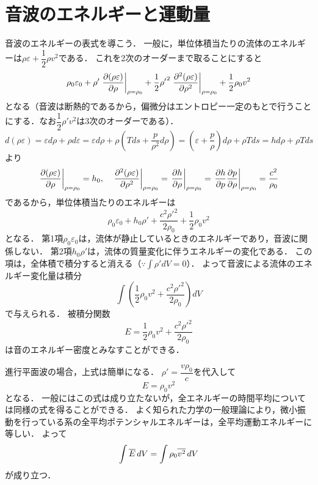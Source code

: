 \section{音波のエネルギーと運動量}

音波のエネルギーの表式を導こう．
一般に，単位体積当たりの流体のエネルギーは$\rho\varepsilon+\dfrac{1}{2}\rho v^2$である．
これを2次のオーダーまで取ることにすると
\[
    \rho_0\varepsilon_0 + \rho' \eval{\pdv{(\rho\varepsilon)}{\rho}}_{\rho=\rho_0} + \frac{1}{2} {\rho'}^2 \eval{\pdv[2]{(\rho\varepsilon)}{\rho}}_{\rho=\rho_0}
    +\frac{1}{2}\rho_0 v^2
\]
となる（音波は断熱的であるから，偏微分はエントロピー一定のもとで行うことにする．なお$\dfrac{1}{2}\rho' v^2$は3次のオーダーである）．
\[
    d(\rho\varepsilon) = \varepsilon d\rho + \rho d\varepsilon
    = \varepsilon d\rho + \rho\left(Tds+\frac{p}{\rho^2}d\rho\right)
    = \left( \varepsilon+\frac{p}{\rho} \right) d\rho + \rho T ds
    = h d\rho + \rho T ds
\]
より
\[
    \eval{\pdv{(\rho\varepsilon)}{\rho}}_{\rho=\rho_0} = h_0, \quad
    \eval{\pdv[2]{(\rho\varepsilon)}{\rho}}_{\rho=\rho_0} = \eval{\pdv{h}{\rho}}_{\rho=\rho_0}
    = \eval{\pdv{h}{p}\pdv{p}{\rho}}_{\rho=\rho_0} = \frac{c^2}{\rho_0}
\]
であるから，単位体積当たりのエネルギーは
\[
    \rho_0\varepsilon_0 + h_0 \rho' + \frac{c^2{\rho'}^2}{2\rho_0} + \frac{1}{2} \rho_0 v^2
\]
となる．
第1項$\rho_0\varepsilon_0$は，流体が静止しているときのエネルギーであり，音波に関係しない．
第2項$ h_0 \rho'$は，流体の質量変化に伴うエネルギーの変化である．
この項は，全体積で積分すると消える（$\because \int\rho' dV=0$）．
よって音波による流体のエネルギー変化量は積分
\[
    \int \left( \frac{1}{2} \rho_0 v^2 + \frac{c^2{\rho'}^2}{2\rho_0} \right) dV
\]
で与えられる．
被積分関数
\begin{equation}
    E = \frac{1}{2} \rho_0 v^2 + \frac{c^2{\rho'}^2}{2\rho_0}
\end{equation}
は音のエネルギー密度とみなすことができる．

進行平面波の場合，上式は簡単になる．
$\rho' = \dfrac{v \rho_0}{c}$を代入して
\begin{equation}
    E = \rho_0 v^2
\end{equation}
となる．
一般にはこの式は成り立たないが，全エネルギーの時間平均については同様の式を得ることができる．
よく知られた力学の一般理論により，微小振動を行っている系の全平均ポテンシャルエネルギーは，全平均運動エネルギーに等しい．
よって
\begin{equation}
    \int \overline{E} \, dV = \int \rho_0 \overline{v^2} \, dV
\end{equation}
が成り立つ．



